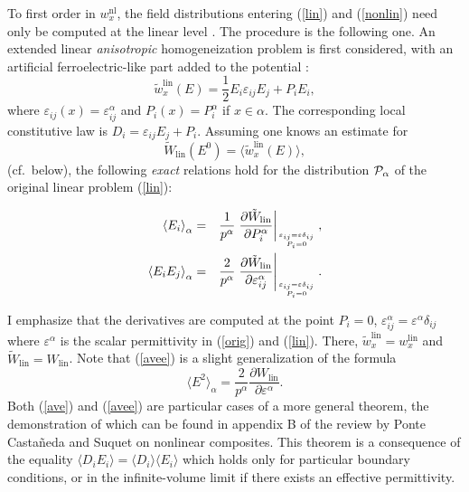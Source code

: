 To first order in $w_x^{\text{nl}}$, the field distributions entering
(\ref{lin}) and (\ref{nonlin}) need only be computed at the linear
level \cite{AHAR87,STRO88}. The procedure is the following one. An
extended linear {\em anisotropic} homogeneization problem is first
considered, with an artificial ferroelectric-like part added to the
potential \cite{PONT97}:
\begin{equation}
\label{ferroel}
\tilde{w}^{\text{lin}}_x(E)=\frac{1}{2} E_i\varepsilon_{ij} E_j+
P_{i} E_i,
\end{equation}
where $\varepsilon_{ij}(x)=\varepsilon^\alpha_{ij}$ and $P_i(x)=
P_i^\alpha$ if $x\in\alpha$. The corresponding local constitutive
law is $D_i=\varepsilon_{ij} E_j+P_i$. Assuming one knows an estimate
for
\begin{equation}
\tilde{W}_{\text{lin}}(E^0)=\langle \tilde{w}^{\text{lin}}_x(E)\rangle,
\end{equation}
(cf.\ below), the following {\em exact} relations hold for the distribution
${\cal{P}}_\alpha$ of the original linear problem (\ref{lin}):
\begin{mathletters}
\label{avfield}
\begin{eqnarray}
\label{ave}
\left\langle E_i\right\rangle_{\alpha}&=&\frac{1}{p^\alpha}\left.
\frac{\partial \tilde{W}_{\text{lin}}}{\partial P^\alpha_i}
\right|_{\varepsilon_{ij}=\varepsilon \delta_{ij}\atop P_i=0},\\
\label{avee}
\left\langle E_i E_j\right\rangle_{\alpha}&=&\frac{2}{p^\alpha}
\left.\frac{\partial \tilde{W}_{\text{lin}}}{\partial \varepsilon^\alpha_{ij}}\right|_{\varepsilon_{ij}=\varepsilon  \delta_{ij}\atop P_i=0}.
\end{eqnarray}
\end{mathletters}
I emphasize that the derivatives are computed at the point $P_i=0$,
$\varepsilon^\alpha_{ij}=\varepsilon^\alpha \delta_{ij}$ where
$\varepsilon^\alpha$ is the scalar permittivity in (\ref{orig})
and (\ref{lin}). There, $\tilde{w}^{\text{lin}}_x=w^{\text{lin}}_x$
and $\tilde{W}_{\text{lin}}=W_{\text{lin}}$. Note that (\ref{avee})
is a slight generalization of the formula \cite{BERG78}
\begin{equation}
\label{derivscal}
\langle E^2\rangle_\alpha=\frac{2}{p^\alpha}\frac{\partial  W_{\text{lin}}}{\partial\varepsilon^\alpha}.
\end{equation}
Both (\ref{ave}) and (\ref{avee}) are particular cases of a more
general theorem, the demonstration of which can be found in appendix
B of the review by Ponte Casta\~{n}eda and Suquet on nonlinear
composites\cite{PONT98}. This theorem is a consequence of the
equality $\langle D_i E_i\rangle=\langle D_i\rangle \langle E_i\rangle$
which holds only for particular boundary conditions, or in the
infinite-volume limit if there exists an effective permittivity.

